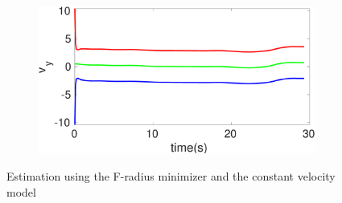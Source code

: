 \begin{figure}[h]
\begin{subfigure}{.5\linewidth}
\end{subfigure}
\begin{subfigure}{.5\linewidth}
\centering
\includegraphics[width=\linewidth]{figures/Frad/s3cvSMv_y}
\end{subfigure}
\caption{Estimation using the F-radius minimizer and the constant velocity model}
\end{figure}

